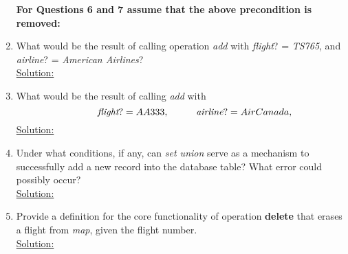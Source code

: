 \begin{enumerate}
\begin{itemize}
  \end{itemize}
  \textbf{For Questions 6 and 7 assume that the above precondition is removed:}\\
  \item What would be the result of calling operation \emph{add} with \emph{flight}? = \emph{TS765}, and \emph{airline}? = \emph{American Airlines}?\\
  \noindent\underline{Solution:}\\
  \item What would be the result of calling \emph{add} with\
  \[
  \hspace{10mm} \emph{flight}? = AA333,\\
  \hspace{10mm} \emph{airline}? = Air Canada,
  \]
  \noindent\underline{Solution:}\\
  \item Under what conditions, if any, can \emph{set union} serve as a mechanism to successfully add a new record into the database table? What error could possibly occur?\\
  \noindent\underline{Solution:}\\
  \item Provide a definition for the core functionality of operation \textbf{delete} that erases a flight from \emph{map}, given the flight number.\\
  \noindent\underline{Solution:}\\

  
  


\end{enumerate}
